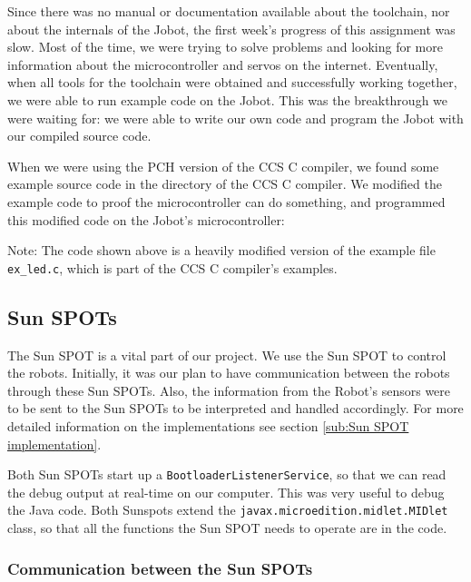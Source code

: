 \documentclass[a4paper,10pt]{article} %
\begin{document}
Since there was no manual or documentation available about the toolchain, nor
about the internals of the Jobot, the first week's progress of this assignment
was slow. Most of the time, we were trying to solve problems and looking for
more information about the microcontroller and servos on the internet.
Eventually, when all tools for the toolchain were obtained and successfully
working together, we were able to run example code on the Jobot. This was the
breakthrough we were waiting for: we were able to write our own code and program
the Jobot with our compiled source code.

When we were using the PCH version of the CCS C compiler, we found some example
source code in the directory of the CCS C compiler. We modified the example code
to proof the microcontroller can do something, and programmed this modified code
on the Jobot's microcontroller:



\noindent Note: The code shown above is a heavily modified version of the
example file \texttt{ex\_led.c}, which is part of the CCS C compiler's examples.



\subsection{Sun SPOTs} %
\label{sec:sunspot}

The Sun SPOT is a vital part of our project. We use the Sun SPOT to control the
robots. Initially, it was our plan to have communication between the robots
through these Sun SPOTs. Also, the information from the Robot's sensors were to
be sent to the Sun SPOTs to be interpreted and handled accordingly. For more
detailed information on the implementations see section \ref{sub:Sun SPOT
implementation}.

Both Sun SPOTs start up
a \texttt{BootloaderListenerService}, so that we can read the debug output at
real-time on our computer. This was very useful to debug the Java code. Both
Sunspots extend the \texttt{javax.microedition.midlet.MIDlet} class, so that all
the functions the Sun SPOT needs to operate are in the code.

\subsubsection{Communication between the Sun SPOTs} %
\label{subsec:comm}
\end{document}
